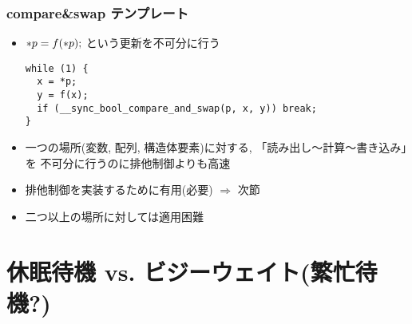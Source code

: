 \documentclass[12pt,dvipdfmx]{beamer}
\begin{document}
\begin{frame}[fragile]
  \frametitle{compare\&swap テンプレート}
\begin{itemize}
\item ${\tt *}p = f({\tt *}p);$ という更新を不可分に行う
\begin{lstlisting}
while (1) {
  x = *p;
  y = f(x);
  if (__sync_bool_compare_and_swap(p, x, y)) break;
}  
\end{lstlisting}
\item 一つの場所(変数, 配列, 構造体要素)に対する,
  「読み出し〜計算〜書き込み」を
  不可分に行うのに排他制御よりも高速
\item 排他制御を実装するために有用(必要) $\Rightarrow$ 次節
\item 二つ以上の場所に対しては適用困難
\end{itemize}
\end{frame}

\section{休眠待機 vs. ビジーウェイト(繁忙待機?)}
\iffalse
\begin{frame}[fragile]
  \frametitle{排他制御実装の別解?}
  \begin{itemize}
  \item lockの実装: 改めて\mura{何のために}ブロックしているのか?
\begin{lstlisting}
int lock(mutex_t * m) {
  while (!test_and_set(&m->locked)) {
    /* m->locked == 1 だったらブロック */
    @\ao{\tt futex(\&m->locked, FUTEX\_WAIT, 1, 0, 0, 0);}@  } }
\end{lstlisting}
  \end{itemize}
  \begin{columns}
    \begin{column}{0.6\textwidth}
  \begin{itemize}
  \item これでは何がいけない?
\begin{lstlisting}
int lock'(mutex_t * m) {
  while (!test_and_set(&m->locked)) {
    /* 何もしない */ } }

int unlock'(mutex_t * m) {
  m->locked = 0; }
\end{lstlisting}
\end{itemize}      
\end{column}
\begin{column}{0.4\textwidth}
  \begin{center}
\texttt{[image: out/pdf/svg/spin\_lock.pdf]}
  \end{center}
\end{column}
\end{columns}
\begin{itemize}
\item 「他のスレッドが{\tt m->locked}を変更してくれるのを待っている」点は同じ
\item そして後者の方が「ブロックする・起こす」オーバーヘッドも少ない
  \end{itemize}
\end{frame}
\fi
\end{document}
